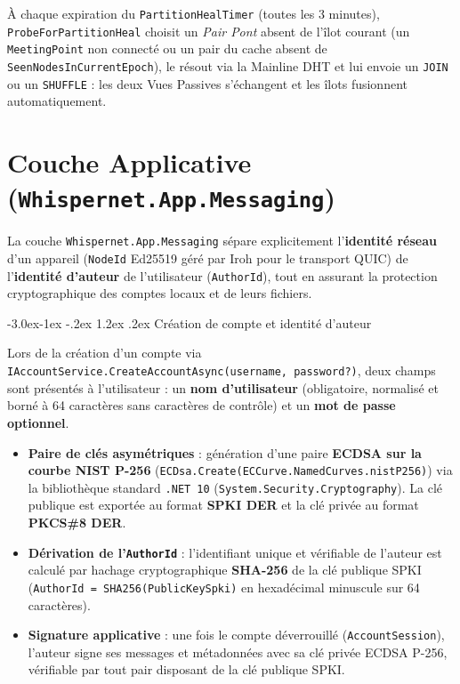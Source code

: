\documentclass[11pt,a4paper]{article}
\makeatletter
\renewcommand\subsection{\@startsection{subsection}{2}{\z@}%
                                     {-3.0ex\@plus -1ex \@minus -.2ex}%
                                     {1.2ex \@plus .2ex}%
                                     {\normalfont\large\bfseries\color{PrimaryBlue}}}
\makeatother
\begin{document}
À chaque expiration du \texttt{PartitionHealTimer} (toutes les 3 minutes), \texttt{ProbeForPartitionHeal} choisit un \emph{Pair Pont} absent de l'îlot courant (un \texttt{MeetingPoint} non connecté ou un pair du cache absent de \texttt{SeenNodesInCurrentEpoch}), le résout via la Mainline DHT et lui envoie un \texttt{JOIN} ou un \texttt{SHUFFLE} : les deux Vues Passives s'échangent et les îlots fusionnent automatiquement.

\section{Couche Applicative (\texttt{Whispernet.App.Messaging})}

La couche \texttt{Whispernet.App.Messaging} sépare explicitement l'\textbf{identité réseau} d'un appareil (\texttt{NodeId} Ed25519 géré par Iroh pour le transport QUIC) de l'\textbf{identité d'auteur} de l'utilisateur (\texttt{AuthorId}), tout en assurant la protection cryptographique des comptes locaux et de leurs fichiers.

\subsection{Création de compte et identité d'auteur}

Lors de la création d'un compte via \texttt{IAccountService.CreateAccountAsync(username, password?)}, deux champs sont présentés à l'utilisateur : un \textbf{nom d'utilisateur} (obligatoire, normalisé et borné à 64 caractères sans caractères de contrôle) et un \textbf{mot de passe optionnel}.

\begin{itemize}
    \item \textbf{Paire de clés asymétriques} : génération d'une paire \textbf{ECDSA sur la courbe NIST P-256} (\texttt{ECDsa.Create(ECCurve.NamedCurves.nistP256)}) via la bibliothèque standard \texttt{.NET 10} (\texttt{System.Security.Cryptography}). La clé publique est exportée au format \textbf{SPKI DER} et la clé privée au format \textbf{PKCS\#8 DER}.
    \item \textbf{Dérivation de l'\texttt{AuthorId}} : l'identifiant unique et vérifiable de l'auteur est calculé par hachage cryptographique \textbf{SHA-256} de la clé publique SPKI (\texttt{AuthorId = SHA256(PublicKeySpki)} en hexadécimal minuscule sur 64 caractères).
    \item \textbf{Signature applicative} : une fois le compte déverrouillé (\texttt{AccountSession}), l'auteur signe ses messages et métadonnées avec sa clé privée ECDSA P-256, vérifiable par tout pair disposant de la clé publique SPKI.
\end{itemize}
\end{document}

